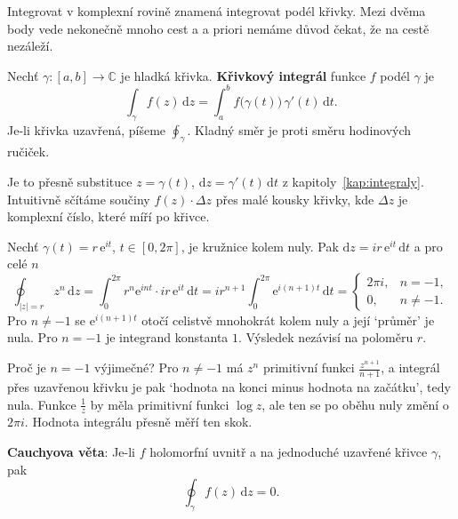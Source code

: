 Integrovat v komplexní rovině znamená integrovat podél křivky. Mezi dvěma body vede nekonečně mnoho cest a a priori nemáme důvod čekat, že na cestě nezáleží.

\begin{definitionbox}
  Nechť $\gamma\colon[a, b]\to\mathbb{C}$ je hladká křivka. \textbf{Křivkový integrál} funkce $f$ podél $\gamma$ je
  \begin{equation*}
    \int_\gamma f(z)\,\mathrm{d}z = \int_a^b f\big(\gamma(t)\big)\,\gamma'(t)\,\mathrm{d}t.
  \end{equation*}
  Je-li křivka uzavřená, píšeme $\oint_\gamma$. Kladný směr je proti směru hodinových ručiček.
\end{definitionbox}

Je to přesně substituce $z = \gamma(t)$, $\mathrm{d}z = \gamma'(t)\,\mathrm{d}t$ z kapitoly~\ref{kap:integraly}. Intuitivně sčítáme součiny $f(z)\cdot\Delta z$ přes malé kousky křivky, kde $\Delta z$ je komplexní číslo, které míří po křivce.

\begin{example}
  Nechť $\gamma(t) = r\,\mathrm{e}^{it}$, $t\in[0, 2\pi]$, je kružnice kolem nuly. Pak $\mathrm{d}z = ir\,\mathrm{e}^{it}\,\mathrm{d}t$ a pro celé $n$
  \begin{equation*}
    \oint_{|z| = r}z^n\,\mathrm{d}z = \int_0^{2\pi}r^n\mathrm{e}^{int}\cdot ir\,\mathrm{e}^{it}\,\mathrm{d}t = ir^{n+1}\int_0^{2\pi}\mathrm{e}^{i(n+1)t}\,\mathrm{d}t = \begin{cases}2\pi i, & n = -1,\\ 0, & n\neq -1.\end{cases}
  \end{equation*}
  Pro $n\neq -1$ se $\mathrm{e}^{i(n+1)t}$ otočí celistvě mnohokrát kolem nuly a její `průměr' je nula. Pro $n = -1$ je integrand konstanta $1$. Výsledek nezávisí na poloměru $r$.
\end{example}

Proč je $n = -1$ výjimečné? Pro $n\neq -1$ má $z^n$ primitivní funkci $\frac{z^{n+1}}{n + 1}$, a integrál přes uzavřenou křivku je pak `hodnota na konci minus hodnota na začátku', tedy nula. Funkce $\frac{1}{z}$ by měla primitivní funkci $\log z$, ale ten se po oběhu nuly změní o $2\pi i$. Hodnota integrálu přesně měří ten skok.

\begin{definitionbox}
  \textbf{Cauchyova věta}: Je-li $f$ holomorfní uvnitř a na jednoduché uzavřené křivce $\gamma$, pak
  \begin{equation*}
    \oint_\gamma f(z)\,\mathrm{d}z = 0.
  \end{equation*}
\end{definitionbox}

